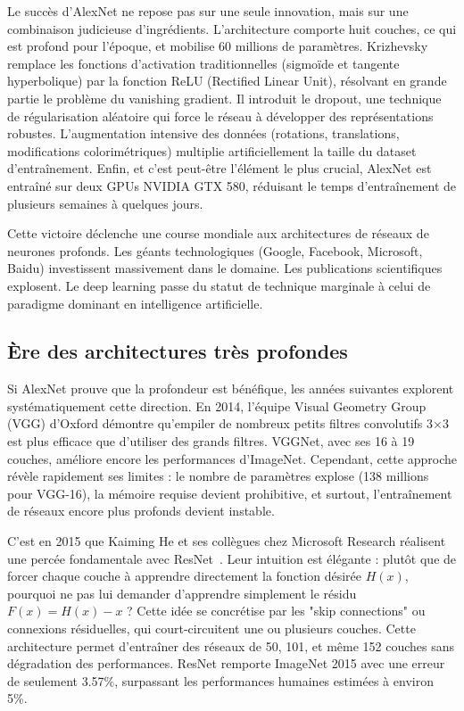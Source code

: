 Le succès d'AlexNet ne repose pas sur une seule innovation, mais sur une combinaison judicieuse d'ingrédients. L'architecture comporte huit couches, ce qui est profond pour l'époque, et mobilise 60 millions de paramètres. Krizhevsky remplace les fonctions d'activation traditionnelles (sigmoïde et tangente hyperbolique) par la fonction ReLU (Rectified Linear Unit), résolvant en grande partie le problème du vanishing gradient. Il introduit le dropout, une technique de régularisation aléatoire qui force le réseau à développer des représentations robustes. L'augmentation intensive des données (rotations, translations, modifications colorimétriques) multiplie artificiellement la taille du dataset d'entraînement. Enfin, et c'est peut-être l'élément le plus crucial, AlexNet est entraîné sur deux GPUs NVIDIA GTX 580, réduisant le temps d'entraînement de plusieurs semaines à quelques jours.

Cette victoire déclenche une course mondiale aux architectures de réseaux de neurones profonds. Les géants technologiques (Google, Facebook, Microsoft, Baidu) investissent massivement dans le domaine. Les publications scientifiques explosent. Le deep learning passe du statut de technique marginale à celui de paradigme dominant en intelligence artificielle.

\subsection{Ère des architectures très profondes}

Si AlexNet prouve que la profondeur est bénéfique, les années suivantes explorent systématiquement cette direction. En 2014, l'équipe Visual Geometry Group (VGG) d'Oxford démontre qu'empiler de nombreux petits filtres convolutifs 3×3 est plus efficace que d'utiliser des grands filtres. VGGNet, avec ses 16 à 19 couches, améliore encore les performances d'ImageNet. Cependant, cette approche révèle rapidement ses limites : le nombre de paramètres explose (138 millions pour VGG-16), la mémoire requise devient prohibitive, et surtout, l'entraînement de réseaux encore plus profonds devient instable.

C'est en 2015 que Kaiming He et ses collègues chez Microsoft Research réalisent une percée fondamentale avec ResNet~\cite{He2016}. Leur intuition est élégante : plutôt que de forcer chaque couche à apprendre directement la fonction désirée $H(x)$, pourquoi ne pas lui demander d'apprendre simplement le résidu $F(x) = H(x) - x$ ? Cette idée se concrétise par les "skip connections" ou connexions résiduelles, qui court-circuitent une ou plusieurs couches. Cette architecture permet d'entraîner des réseaux de 50, 101, et même 152 couches sans dégradation des performances. ResNet remporte ImageNet 2015 avec une erreur de seulement 3.57\%, surpassant les performances humaines estimées à environ 5\%.

